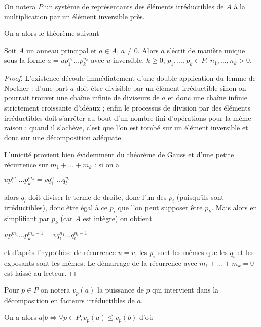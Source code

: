 \begin{de}
On notera $P$ un système de représentants des éléments
irréductibles de $A$ à la multiplication par un élément inversible près.
\end{de}

On a alors le théorème suivant

\begin{thm}
Soit $A$ un
anneau principal et $a \in A$, $a \neq 0$. Alors $a$ s'écrit de manière unique sous la forme $a = u p_1^{n_1} \ldots p_k^{n_k}$
avec $u$ inversible, $k \geq 0$,
$p_1, \ldots, p_k \in P$,
$n_1, \ldots, n_k > 0$.
\end{thm}

\begin{proof}
L'existence découle immédiatement d'une double application
du lemme de Noether : d'une part $a$ doit être divisible par un élément
irréductible sinon on pourrait trouver une chaîne infinie de diviseurs
de $a$ et donc une chaîne infinie strictement croissante d'idéaux ; enfin
le processus de division par des éléments irréductibles doit s'arrêter
au bout d'un nombre fini d'opérations pour la même raison ; quand il
s'achève, c'est que l'on est tombé sur un élément inversible et donc sur
une décomposition adéquate.

L'unicité provient bien évidemment du théorème de Gauss et d'une petite
récurrence sur $m_1 + \ldots + m_k$ : si on a

$u p_1^{m_1} \ldots p_k^{m_k} = v q_1^{n_1} \ldots q_l^{n_l}$

alors $q_l$ doit diviser le terme de droite, donc l'un des
$p_i$ (puisqu'ils sont irréductibles), donc être égal à ce
$p_i$ que l'on peut supposer être $p_k$. Mais alors en
simplifiant par $p_k$ (car $A$ est intègre) on obtient

$u p_1^{m_1} \ldots p_k^{m_k-1} = v q_1^{n_1} \ldots q_l^{n_l-1}$

et d'après l'hypothèse de récurrence $u = v$, les $p_i$ sont les
mêmes que les $q_i$ et les exposants sont les mêmes. Le démarrage
de la récurrence avec $m_1 + \ldots + m_k = 0$ est laissé au lecteur.
\end{proof}

\begin{de}
Pour $p \in P$ on notera $v_p(a)$ la puissance de $p$
qui intervient dans la décomposition en facteurs irréductibles de $a$.
\end{de}

\begin{rem}
On a alors $a | b \Leftrightarrow \forall p \in P, v_p(a) \leq v_p(b)$ d'où
\end{rem}

